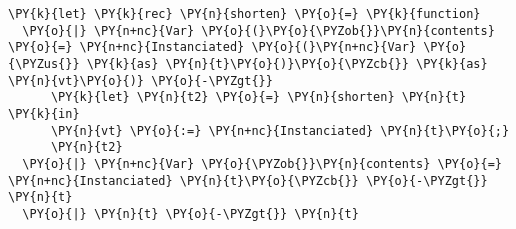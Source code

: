 \begin{Verbatim}[commandchars=\\\{\}]
\PY{k}{let} \PY{k}{rec} \PY{n}{shorten} \PY{o}{=} \PY{k}{function}
  \PY{o}{|} \PY{n+nc}{Var} \PY{o}{(}\PY{o}{\PYZob{}}\PY{n}{contents} \PY{o}{=} \PY{n+nc}{Instanciated} \PY{o}{(}\PY{n+nc}{Var} \PY{o}{\PYZus{}} \PY{k}{as} \PY{n}{t}\PY{o}{)}\PY{o}{\PYZcb{}} \PY{k}{as} \PY{n}{vt}\PY{o}{)} \PY{o}{-\PYZgt{}}
      \PY{k}{let} \PY{n}{t2} \PY{o}{=} \PY{n}{shorten} \PY{n}{t} \PY{k}{in}
      \PY{n}{vt} \PY{o}{:=} \PY{n+nc}{Instanciated} \PY{n}{t}\PY{o}{;}
      \PY{n}{t2}
  \PY{o}{|} \PY{n+nc}{Var} \PY{o}{\PYZob{}}\PY{n}{contents} \PY{o}{=} \PY{n+nc}{Instanciated} \PY{n}{t}\PY{o}{\PYZcb{}} \PY{o}{-\PYZgt{}} \PY{n}{t}
  \PY{o}{|} \PY{n}{t} \PY{o}{-\PYZgt{}} \PY{n}{t}
\end{Verbatim}
